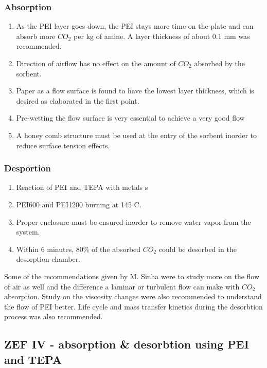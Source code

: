 \subsubsection{Absorption}

\begin{enumerate}
    \item As the PEI layer goes down, the PEI stays more time on the plate and can absorb more $CO_2$ per kg of amine. A layer thickness of about 0.1 mm was recommended. 
    \item Direction of airflow has no effect on the amount of $CO_2$ absorbed by the sorbent. 
    \item Paper as a flow surface is found to have the lowest layer thickness, which is desired as elaborated in the first point. 
    \item Pre-wetting the flow surface is very essential to achieve a very good flow
    \item A honey comb structure must be used at the entry of the sorbent inorder to reduce surface tension effects. 
\end{enumerate}

\subsubsection{Desportion}

\begin{enumerate}
    \item Reaction of PEI and TEPA with metals s
    \item PEI600 and PEI1200 burning at 145 \degree C. 
    \item Proper enclosure must be ensured inorder to remove water vapor from the system. 
    \item Within 6 minutes, 80\% of the absorbed $CO_2$ could be desorbed in the desorption chamber. 
\end{enumerate}

Some of the recommendations given by M. Sinha were to study more on the flow of air as well and the difference a laminar or turbulent flow can make with $CO_2$ absorption. Study on the viscosity changes were also recommended to understand the flow of PEI better. Life cycle and mass transfer kinetics during the desorbtion process was also recommended.   



\subsection{ZEF IV - absorption \& desorbtion using PEI and TEPA}
\label{sec:zef4}

